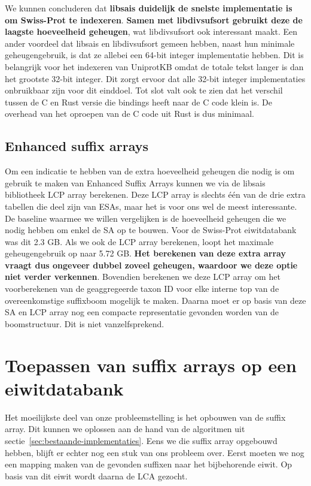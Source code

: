 We kunnen concluderen dat \textbf{libsais duidelijk de snelste implementatie is om Swiss-Prot te indexeren}.
\textbf{Samen met libdivsufsort gebruikt deze de laagste hoeveelheid geheugen}, wat libdivsufsort ook interessant maakt.
Een ander voordeel dat libsais en libdivsufsort gemeen hebben, naast hun minimale geheugengebruik, is dat ze allebei een 64-bit integer implementatie hebben.
Dit is belangrijk voor het indexeren van UniprotKB omdat de totale tekst langer is dan het grootste 32-bit integer.
Dit zorgt ervoor dat alle 32-bit integer implementaties onbruikbaar zijn voor dit einddoel.
Tot slot valt ook te zien dat het verschil tussen de C en Rust versie die bindings heeft naar de C code klein is.
De overhead van het oproepen van de C code uit Rust is dus minimaal.

\subsection{Enhanced suffix arrays}\label{subsec:enhanced-suffix-arrays}
Om een indicatie te hebben van de extra hoeveelheid geheugen die nodig is om gebruik te maken van Enhanced Suffix Arrays kunnen we via de libsais bibliotheek LCP array berekenen.
Deze LCP array is slechts één van de drie extra tabellen die deel zijn van ESAs, maar het is voor ons wel de meest interessante.
De baseline waarmee we willen vergelijken is de hoeveelheid geheugen die we nodig hebben om enkel de SA op te bouwen.
Voor de Swiss-Prot eiwitdatabank was dit 2.3 GB\@.
Als we ook de LCP array berekenen, loopt het maximale geheugengebruik op naar 5.72 GB\@.
\textbf{Het berekenen van deze extra array vraagt dus ongeveer dubbel zoveel geheugen, waardoor we deze optie niet verder verkennen}.
Bovendien berekenen we deze LCP array om het voorberekenen van de geaggregeerde taxon ID voor elke interne top van de overeenkomstige suffixboom mogelijk te maken.
Daarna moet er op basis van deze SA en LCP array nog een compacte representatie gevonden worden van de boomstructuur.
Dit is niet vanzelfsprekend.


\section{Toepassen van suffix arrays op een eiwitdatabank}\label{sec:toepassen-van-suffix-arrays-op-een-eiwitdatabank}
Het moeilijkste deel van onze probleemstelling is het opbouwen van de suffix array.
Dit kunnen we oplossen aan de hand van de algoritmen uit sectie~\ref{sec:bestaande-implementaties}.
Eens we die suffix array opgebouwd hebben, blijft er echter nog een stuk van ons probleem over.
Eerst moeten we nog een mapping maken van de gevonden suffixen naar het bijbehorende eiwit.
Op basis van dit eiwit wordt daarna de LCA gezocht.

